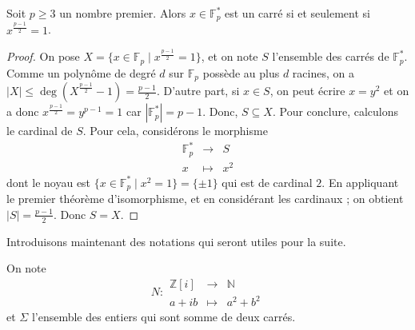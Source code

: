






  \begin{lemma}
    \label{theoreme-des-deux-carres-fermat-1}
    Soit $p \geq 3$ un nombre premier. Alors $x \in \mathbb{F}^*_p$ est un carré si et seulement si $x^{\frac{p-1}{2}} = 1$.
  \end{lemma}

  \begin{proof}
    On pose $X = \{ x \in \mathbb{F}_p \mid x^{\frac{p-1}{2}} = 1 \}$, et on note $S$ l'ensemble des carrés de $\mathbb{F}_p^*$. Comme un polynôme de degré $d$ sur $\mathbb{F}_p$ possède au plus $d$ racines, on a $|X| \leq \deg \left( X^{\frac{p-1}{2}} - 1 \right) = \frac{p-1}{2}$.
    \newpar
    D'autre part, si $x \in S$, on peut écrire $x = y^2$ et on a donc $x^{\frac{p-1}{2}} = y^{p-1} = 1$ car $|\mathbb{F}_p^*| = p-1$. Donc, $S \subseteq X$.
    \newpar
    Pour conclure, calculons le cardinal de $S$. Pour cela, considérons le morphisme
    \[
    \begin{array}{ccc}
      \mathbb{F}_p^* &\rightarrow& S \\
      x &\mapsto& x^2
    \end{array}
    \]
    dont le noyau est $\{ x \in \mathbb{F}_p^* \mid x^2 = 1 \} = \{ \pm 1 \}$ qui est de cardinal $2$. En appliquant le premier théorème d'isomorphisme, et en considérant les cardinaux ; on obtient $|S| = \frac{p-1}{2}$. Donc $S = X$.
  \end{proof}

  Introduisons maintenant des notations qui seront utiles pour la suite.

  \begin{notation}
    On note \[ N :
    \begin{array}{ccc}
      \mathbb{Z}[i] &\rightarrow& \mathbb{N} \\
      a+ib &\mapsto& a^2 + b^2
    \end{array}
    \] et $\Sigma$ l'ensemble des entiers qui sont somme de deux carrés.
  \end{notation}

